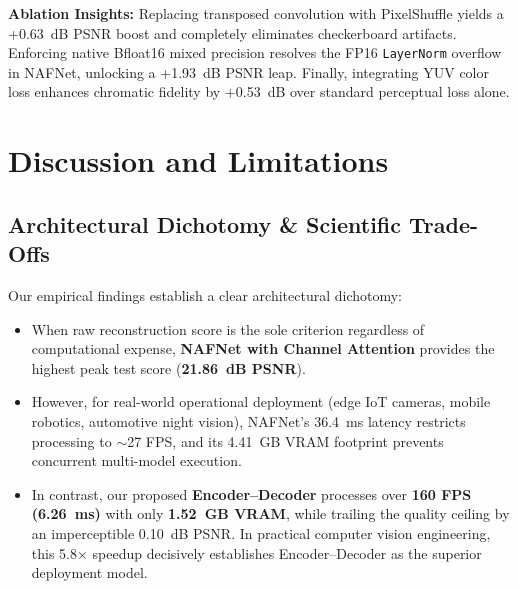 \documentclass[journal,onecolumn,11pt]{IEEEtran}
\begin{document}
\textbf{Ablation Insights:} Replacing transposed convolution with PixelShuffle yields a +0.63~dB PSNR boost and completely eliminates checkerboard artifacts. Enforcing native Bfloat16 mixed precision resolves the FP16 \texttt{LayerNorm} overflow in NAFNet, unlocking a +1.93~dB PSNR leap. Finally, integrating YUV color loss enhances chromatic fidelity by +0.53~dB over standard perceptual loss alone.

\section{Discussion and Limitations}

\subsection{Architectural Dichotomy \& Scientific Trade-Offs}
Our empirical findings establish a clear architectural dichotomy:
\begin{itemize}
    \item When raw reconstruction score is the sole criterion regardless of computational expense, \textbf{NAFNet with Channel Attention} provides the highest peak test score (\textbf{21.86~dB PSNR}).
    \item However, for real-world operational deployment (edge IoT cameras, mobile robotics, automotive night vision), NAFNet's 36.4~ms latency restricts processing to $\sim$27 FPS, and its 4.41~GB VRAM footprint prevents concurrent multi-model execution.
    \item In contrast, our proposed \textbf{Encoder--Decoder} processes over \textbf{160 FPS (6.26~ms)} with only \textbf{1.52~GB VRAM}, while trailing the quality ceiling by an imperceptible 0.10~dB PSNR. In practical computer vision engineering, this 5.8$\times$ speedup decisively establishes Encoder--Decoder as the superior deployment model.
\end{itemize}
\end{document}
